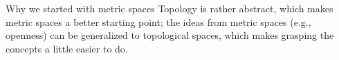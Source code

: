 \begin{remarkBox}{Why we started with metric spaces}
    Topology is rather abstract, which makes metric spaces a better starting 
    point; the ideas from metric spaces (e.g., openness) can be generalized 
    to topological spaces, which makes grasping the concepts a little easier
    to do.
\end{remarkBox}
